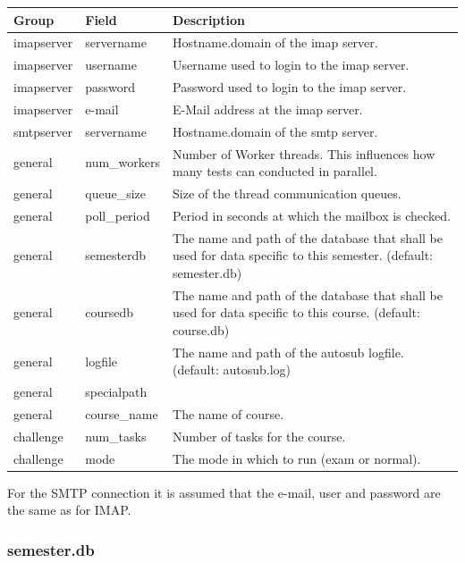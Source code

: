 \begin{tabular}{|p{4cm}|p{4cm}|p{5cm}|}
\hline

{\bf Group} & {\bf Field} & {\bf Description} \\
\hline
\hline
imapserver & servername & Hostname.domain of the imap server.\\
\hline
imapserver & username & Username used to login to the imap server. \\
\hline
imapserver & password & Password used to login to the imap server. \\
\hline
imapserver & e-mail & E-Mail address at the imap server. \\
\hline
\hline
smtpserver & servername & Hostname.domain of the smtp server.\\
\hline
\hline
general & num\_workers & Number of Worker threads. This influences how many
tests can conducted in parallel. \\
\hline
general & queue\_size & Size of the thread communication queues.\\
\hline
general & poll\_period & Period in seconds at which the mailbox is checked.\\
\hline
general & semesterdb & The name and path of the database that shall be used for data specific to
    this semester. (default: semester.db)\\
\hline
general & coursedb & The name and path of the database that shall be used for data specific to
    this course. (default: course.db)\\
\hline
general & logfile & The name and path of the autosub logfile. (default: autosub.log)\\
\hline
general & specialpath & \\
\hline
general & course\_name & The name of course.\\
\hline
\hline
challenge & num\_tasks & Number of tasks for the course.\\
\hline
challenge & mode & The mode in which to run (exam or normal).\\
\hline
\end{tabular}

For the SMTP connection it is assumed that the e-mail, user and password are the same as for IMAP.


\subsubsection{semester.db}

